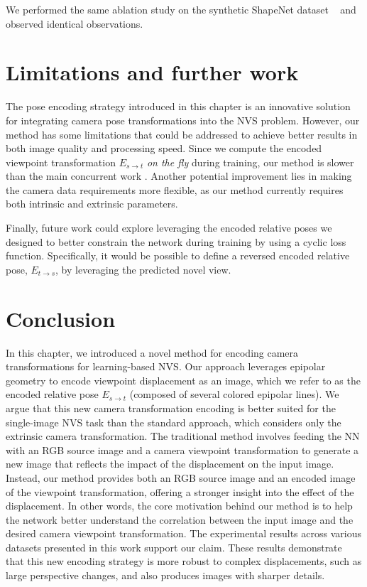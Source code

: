 We performed the same ablation study on the synthetic ShapeNet dataset ~\cite{chang2015shapenet} and observed identical observations.

\section{Limitations and further work}
The pose encoding strategy introduced in this chapter is an innovative solution for integrating camera pose transformations into the \ac{NVS} problem. However, our method has some limitations that could be addressed to achieve better results in both image quality and processing speed. Since we compute the encoded viewpoint transformation $E_{s\xrightarrow{}t}$ \textit{on the fly} during training, our method is slower than the main concurrent work \citep{kim2020novel}. Another potential improvement lies in making the camera data requirements more flexible, as our method currently requires both intrinsic and extrinsic parameters. 

Finally, future work could explore leveraging the encoded relative poses we designed to better constrain the network during training by using a cyclic loss function. Specifically, it would be possible to define a reversed encoded relative pose, $E_{t\xrightarrow{}s}$, by leveraging the predicted novel view. 

\section{Conclusion}
In this chapter, we introduced a novel method for encoding camera transformations for learning-based \ac{NVS}. Our approach leverages epipolar geometry to encode viewpoint displacement as an image, which we refer to as the encoded relative pose $E_{s\xrightarrow{}t}$ (composed of several colored epipolar lines). We argue that this new camera transformation encoding is better suited for the single-image \ac{NVS} task than the standard approach, which considers only the extrinsic camera transformation. The traditional method involves feeding the \ac{NN} with an RGB source image and a camera viewpoint transformation to generate a new image that reflects the impact of the displacement on the input image. Instead, our method provides both an RGB source image and an encoded image of the viewpoint transformation, offering a stronger insight into the effect of the displacement. In other words, the core motivation behind our method is to help the network better understand the correlation between the input image and the desired camera viewpoint transformation. The experimental results across various datasets presented in this work support our claim. These results demonstrate that this new encoding strategy is more robust to complex displacements, such as large perspective changes, and also produces images with sharper details.